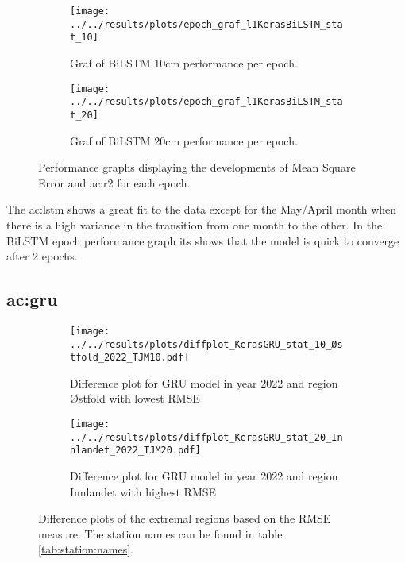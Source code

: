 \begin{figure}
	\begin{subfigure}{0.45\textwidth}
		\centering
		\begin{adjustwidth}{-1in}{-1in}
			\texttt{[image: ../../results/plots/epoch\_graf\_l1KerasBiLSTM\_stat\_10]}
		\end{adjustwidth}
		\caption[Epoch graph BiLSTM 10cm]{Graf of BiLSTM 10cm performance per epoch.}
		\label{fig:epochgrafl1KerasBiLSTMstat10}
	\end{subfigure}
	\begin{subfigure}{0.45\textwidth}
		\centering
		\begin{adjustwidth}{-1in}{-1in}
			\texttt{[image: ../../results/plots/epoch\_graf\_l1KerasBiLSTM\_stat\_20]}
		\end{adjustwidth}
		\caption[Epoch graph BiLSTM 20cm]{Graf of BiLSTM 20cm performance per epoch.}
		\label{fig:epochgrafl1KerasBiLSTMstat20}
	\end{subfigure}
	\caption{Performance graphs displaying the developments of Mean Square Error and \acrfull{ac:r2} for each epoch.}
\end{figure}

The \acrshort{ac:lstm} shows a great fit to the data except for the May/April month when there is a high variance in the transition from one month to the other. In the BiLSTM epoch performance graph its shows that the model is quick to converge after 2 epochs. 

\subsection{\acrfull{ac:gru}}

\begin{figure}
	\begin{subfigure}{0.45\textwidth}
		\centering
		\texttt{[image: ../../results/plots/diffplot\_KerasGRU\_stat\_10\_Østfold\_2022\_TJM10.pdf]}
		\caption[Difference plot of GRU model with lowest RMSE]{Difference plot for GRU model in year 2022 and region Østfold with lowest RMSE}
	\end{subfigure}
	\hfill
	\begin{subfigure}{0.45\textwidth}
		\centering
		\texttt{[image: ../../results/plots/diffplot\_KerasGRU\_stat\_20\_Innlandet\_2022\_TJM20.pdf]}
		\caption[Difference plot of GRU model with highest RMSE]{Difference plot for GRU model in year 2022 and region Innlandet with highest RMSE}
	\end{subfigure}
		\caption[Difference plots of extremal regions GRU]{Difference plots of the extremal regions based on the RMSE measure. The station names can be found in table \ref{tab:station:names}.}
		\label{fig:gru:diff}
\end{figure}

